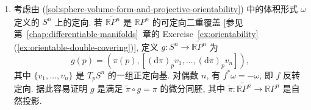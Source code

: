 \begin{description}[font=\normalfont,leftmargin=2em,labelwidth=1.5em]
\begin{enumerate}[label=(\alph*),ref=\alph*,leftmargin=*]
\begin{align*}
\begin{vmatrix}
  v_1^1&\ldots&v_1^{i-1}&v_1^{i+1}&\ldots&v_1^{n+1}\\
  \vdots&&\vdots&\vdots&&\vdots\\
  v_n^1&\ldots&v_n^{i-1}&v_n^{i+1}&\ldots&v_n^{n+1}
  \end{vmatrix}\\
  &=\begin{vmatrix}
  x^1&\ldots&x^{n+1}\\
  v_1^1&\ldots&v_1^{n+1}\\
  \vdots&&\vdots\\
  v_n^1&\ldots&v_n^{n+1}
  \end{vmatrix}\ne0,
\end{align*}
因为 $\{x,v_1,\ldots,v_n\}$ 是 $\mathbb{R}^{n+1}$ 的一组基. 由于
\[
  f^*\omega=(-1)^{n+1}\omega,
\]
当 $n$ 为奇数时, 有 $\omega=\pi^*\theta$, 其中 $\theta\in\Omega^n(\mathbb{R}P^n)$ 必为体积形式 (因为 $\pi$ 是局部微分同胚). 因此, 对奇数 $n$, $\mathbb{R}P^n$ 可定向. 现在设 $n$ 为偶数. 若 $\mathbb{R}P^n$ 可定向, 就存在体积形式 $\theta\in\Omega^n(\mathbb{R}P^n)$. 此时 $\widetilde\omega:=\pi^*\theta$ 是 $S^n$ 上满足 $f^*\widetilde\omega=\widetilde\omega$ 的体积形式. 由于 $\omega$ 也是 $S^n$ 的体积形式, 有 $\widetilde\omega=g\omega$, 其中 $g\in C^\infty(S^n)$ 处处不为零. 但因为 $f^*\omega=-\omega$, 该函数必须满足 $g\circ f=-g$, 即它在对径点处必须取相反的符号, 因而必在某点为零. 因此, 对偶数 $n$, $\mathbb{R}P^n$ 不可定向. 最后, 设 $n$ 为奇数, $U\subset S^n$ 是开半球. 则 $\pi|_U$ 为微分同胚, 且 $\mathbb{R}P^n\setminus\pi(U)$ 的测度为零, 因此
\begin{align*}
  \int_{S^n}\pi^*\theta
  &=\int_U\pi^*\theta+\int_{f(U)}\pi^*\theta
  =\int_U\pi^*\theta+\int_U f^*\pi^*\theta\\
  &=2\int_U\pi^*\theta=2\int_{\mathbb{R}P^n}\theta.
\end{align*}
\item 考虑由 (\ref{sol:sphere-volume-form-and-projective-orientability}) 中的体积形式 $\omega$ 定义的 $S^n$ 上的定向. 若 $\widetilde{\mathbb{R}P^n}$ 是 $\mathbb{R}P^n$ 的可定向二重覆盖 [参见第~\ref{chap:differentiable-manifolds}~章的 Exercise~\ref{ex:orientability}(\ref{ex:orientable-double-covering})], 定义 $g:S^n\to\widetilde{\mathbb{R}P^n}$ 为
\[
  g(p)=(\pi(p),[(\mathrm{d}\pi)_p v_1,\ldots,(\mathrm{d}\pi)_p v_n]),
\]
其中 $\{v_1,\ldots,v_n\}$ 是 $T_pS^n$ 的一组正定向基. 对偶数 $n$, 有 $f^*\omega=-\omega$, 即 $f$ 反转定向. 据此容易证明 $g$ 是满足 $\widetilde\pi\circ g=\pi$ 的微分同胚, 其中 $\widetilde\pi:\widetilde{\mathbb{R}P^n}\to\mathbb{R}P^n$ 是自然投影.
\end{enumerate}


\end{description}
